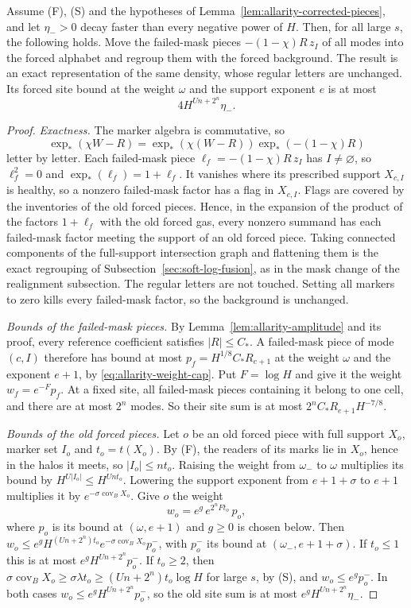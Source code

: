 \begin{lemma}
\label{lem:allarity-launch-regroup}
Assume (F), (S) and the hypotheses of
Lemma~\ref{lem:allarity-corrected-pieces}, and let $\eta_->0$ decay faster
than every negative power of $H$. Then, for all large $s$, the following
holds. Move the failed-mask pieces $-(1-\chi)R\,z_I$ of all modes into the
forced alphabet and regroup them with the forced background. The result is
an exact representation of the same density, whose regular letters are
unchanged. Its forced site bound at the weight $\omega$ and the support
exponent $e$ is at most
\[
 4H^{Un+2^n}\eta_- .
\]
\end{lemma}
\begin{proof}
\emph{Exactness.} The marker algebra is commutative, so
\[
 \exp_*(\chi W-R)=\exp_*(\chi(W-R))\exp_*(-(1-\chi)R)
\] letter by letter. Each
failed-mask piece $\ell_f=-(1-\chi)R\,z_I$ has $I\ne\varnothing$, so
$\ell_f^2=0$ and $\exp_*(\ell_f)=1+\ell_f$. It vanishes where its prescribed
support $X_{c,I}$ is healthy, so a nonzero failed-mask factor has a flag
in $X_{c,I}$. Flags are covered by the inventories of the old forced
pieces. Hence, in the expansion of the product of the factors $1+\ell_f$
with the old forced gas, every nonzero summand has each failed-mask factor
meeting the support of an old forced piece. Taking connected components of
the full-support intersection graph and flattening them is the exact
regrouping of Subsection~\ref{sec:soft-log-fusion}, as in the mask change of
the realignment subsection. The regular letters are not touched. Setting
all markers to zero kills every failed-mask factor, so the background is
unchanged.

\emph{Bounds of the failed-mask pieces.} By
Lemma~\ref{lem:allarity-amplitude} and its proof, every reference
coefficient satisfies $|R|\le C_*$. A failed-mask piece of mode $(c,I)$
therefore has bound at most $p_f=H^{1/8}C_*R_{e+1}$ at the weight $\omega$
and the exponent $e+1$, by \eqref{eq:allarity-weight-cap}. Put $F=\log H$
and give it the weight $w_f=e^{-F}p_f$. At a fixed site, all failed-mask
pieces containing it belong to one cell, and there are at most $2^n$
modes. So their site sum is at most $2^nC_*R_{e+1}H^{-7/8}$.

\emph{Bounds of the old forced pieces.} Let $o$ be an old forced piece
with full support $X_o$, marker set $I_o$ and $t_o=t(X_o)$. By (F), the
readers of its marks lie in $X_o$, hence in the halos it meets, so
$|I_o|\le nt_o$. Raising the weight from $\omega_-$ to $\omega$ multiplies
its bound by $H^{U|I_o|}\le H^{Unt_o}$. Lowering the support exponent from
$e+1+\sigma$ to $e+1$ multiplies it by
$e^{-\sigma\operatorname{cov}_BX_o}$. Give $o$ the weight
\[
 w_o=e^{g}\,e^{2^nFt_o}\,p_o ,
\]
where $p_o$ is its bound at $(\omega,e+1)$ and $g\ge0$ is chosen below.
Then $w_o\le e^gH^{(Un+2^n)t_o}e^{-\sigma\operatorname{cov}_BX_o}p_o^-$,
with $p_o^-$ its bound at $(\omega_-,e+1+\sigma)$. If $t_o\le1$ this is at
most $e^gH^{Un+2^n}p_o^-$. If $t_o\ge2$, then
$\sigma\operatorname{cov}_BX_o\ge\sigma\lambda t_o\ge(Un+2^n)t_o\log H$ for
large $s$, by (S), and $w_o\le e^gp_o^-$. In both cases
$w_o\le e^gH^{Un+2^n}p_o^-$, so the old site sum is at most
$e^gH^{Un+2^n}\eta_-$.


\end{proof}
